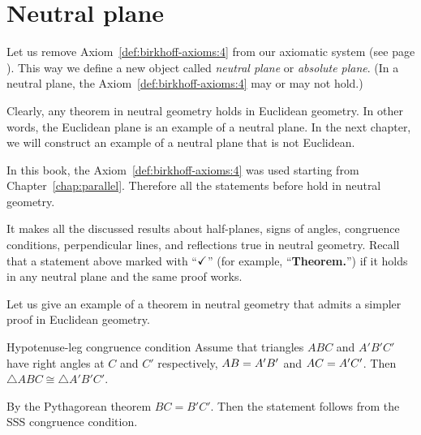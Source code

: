 \chapter{Neutral plane}\label{chap:non-euclid}

Let us remove Axiom~\ref{def:birkhoff-axioms:4} from our axiomatic system (see page \pageref{def:birkhoff-axioms:0}).
This way we define a new object called 
\emph{neutral plane} or \emph{absolute plane}.
(In a neutral plane, the Axiom~\ref{def:birkhoff-axioms:4} may or may not hold.)

Clearly, any theorem in neutral geometry holds in Euclidean geometry.
In other words, the Euclidean plane is an example of a neutral plane. 
In the next chapter, we will construct an example of a neutral plane that is not Euclidean.

In this book, 
the Axiom~\ref{def:birkhoff-axioms:4} was used starting from Chapter~\ref{chap:parallel}.
Therefore all the statements before hold in neutral geometry.

It makes all the discussed results
about
half-planes,
signs of angles,
congruence conditions,
perpendicular lines,
and reflections 
true in neutral geometry.
Recall that a statement above marked with ``$\checkmark$''\label{a-mark} (for example, ``\textbf{Theorem.\abs}'') if it holds in any neutral plane and the same proof works.


Let us give an example of a theorem in neutral geometry that admits a simpler proof in Euclidean geometry. 

\begin{thm}{Hypotenuse-leg congruence condition}
Assume that triangles $ABC$ and $A'B'C'$
have right angles at $C$ and $C'$ respectively, 
$AB\z=A'B'$ and $AC\z=A'C'$.
Then $\triangle ABC\cong\triangle A'B'C'$.
\end{thm}


By the Pythagorean theorem $BC=B'C'$.
Then the statement follows from the SSS congruence condition.
\qeds

